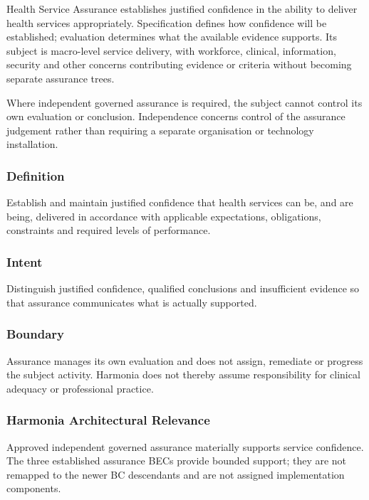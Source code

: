 Health Service Assurance establishes justified confidence in the ability to deliver health services appropriately. Specification defines how confidence will be established; evaluation determines what the available evidence supports. Its subject is macro-level service delivery, with workforce, clinical, information, security and other concerns contributing evidence or criteria without becoming separate assurance trees.


Where independent governed assurance is required, the subject cannot control its own evaluation or conclusion. Independence concerns control of the assurance judgement rather than requiring a separate organisation or technology installation.

\subsubsection*{Definition}

Establish and maintain justified confidence that health services can be, and are being, delivered in accordance with applicable expectations, obligations, constraints and required levels of performance.

\subsubsection*{Intent}

Distinguish justified confidence, qualified conclusions and insufficient evidence so that assurance communicates what is actually supported.

\subsubsection*{Boundary}

Assurance manages its own evaluation and does not assign, remediate or progress the subject activity. Harmonia does not thereby assume responsibility for clinical adequacy or professional practice.

\subsubsection*{Harmonia Architectural Relevance}

Approved independent governed assurance materially supports service confidence. The three established assurance BECs provide bounded support; they are not remapped to the newer BC descendants and are not assigned implementation components.

